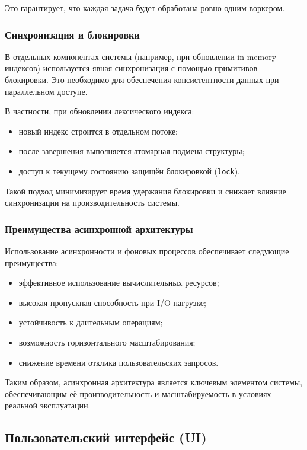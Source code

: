 \documentclass{article}
\begin{document}
Это гарантирует, что каждая задача будет обработана ровно одним воркером.

\subsubsection{Синхронизация и блокировки}

В отдельных компонентах системы (например, при обновлении in-memory индексов) используется явная синхронизация с помощью примитивов блокировки. Это необходимо для обеспечения консистентности данных при параллельном доступе.

В частности, при обновлении лексического индекса:
\begin{itemize}
\item новый индекс строится в отдельном потоке;
\item после завершения выполняется атомарная подмена структуры;
\item доступ к текущему состоянию защищён блокировкой (\texttt{lock}).
\end{itemize}

Такой подход минимизирует время удержания блокировки и снижает влияние синхронизации на производительность системы.

\subsubsection{Преимущества асинхронной архитектуры}

Использование асинхронности и фоновых процессов обеспечивает следующие преимущества:
\begin{itemize}
\item эффективное использование вычислительных ресурсов;
\item высокая пропускная способность при I/O-нагрузке;
\item устойчивость к длительным операциям;
\item возможность горизонтального масштабирования;
\item снижение времени отклика пользовательских запросов.
\end{itemize}

Таким образом, асинхронная архитектура является ключевым элементом системы, обеспечивающим её производительность и масштабируемость в условиях реальной эксплуатации.

\subsection{Пользовательский интерфейс (UI)}
\end{document}
